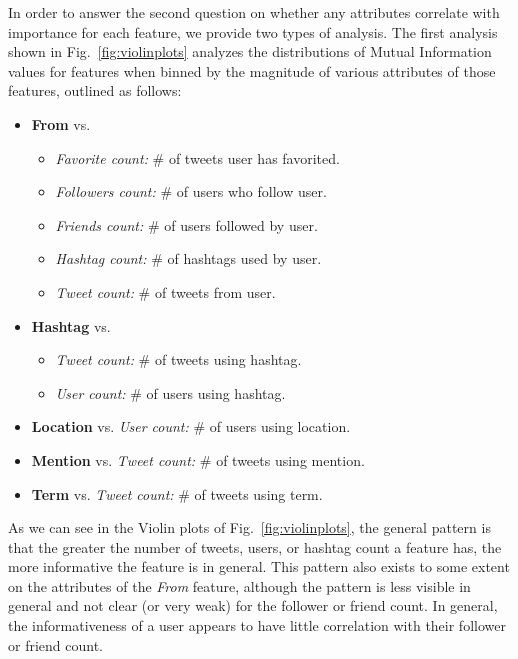 %

In order to answer the second question on whether any attributes
correlate with importance for each feature, we provide two types of
analysis. The first analysis shown in Fig.~\ref{fig:violinplots}
analyzes the distributions of Mutual Information values for features
when binned by the magnitude of various attributes of those
features, outlined as follows:
\begin{itemize}
\item \textbf{From} vs. 
\begin{itemize}
\item \textit{Favorite count:} \# of tweets user has favorited.
\item \textit{Followers count:} \# of users who follow user.
\item \textit{Friends count:} \# of users followed by user.
\item \textit{Hashtag count:} \# of hashtags used by user.
\item \textit{Tweet count:} \# of tweets from user.
 \end{itemize}
\end{itemize}
\begin{itemize}
\item \textbf{Hashtag} vs.
\begin{itemize}
\item \textit{Tweet count:} \# of tweets using hashtag.
\item \textit{User count:} \# of users using hashtag.
\end{itemize}
\end{itemize}
\begin{itemize}
\item \textbf{Location} vs. \textit{User count:} \# of users using location.
\item \textbf{Mention} vs. \textit{Tweet count:} \# of tweets using mention.
\item \textbf{Term} vs. \textit{Tweet count:} \# of tweets using term.
\end{itemize}
As we can see in the Violin plots of Fig.~\ref{fig:violinplots}, the
general pattern is that the greater the number of tweets, users, or
hashtag count a feature has, the more informative the feature is in general.
This pattern also exists to some extent on the attributes
of the \textit{From} feature, although the pattern is less visible in
general and not clear (or very weak) for the follower or friend count.
In general, the informativeness of a user appears to have little correlation
with their follower or friend count.


